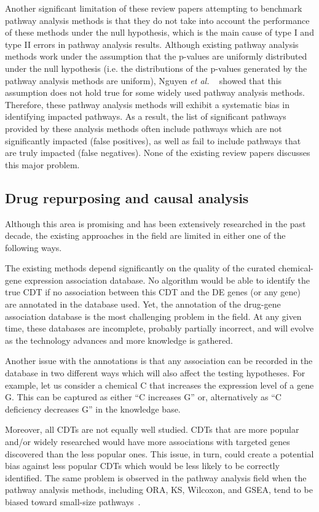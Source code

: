 Another significant limitation of these review papers attempting to benchmark pathway analysis methods is that they do not take into account the performance of these methods under the null hypothesis, which is the main cause of type I and type II errors in pathway analysis results. 
Although existing pathway analysis methods work under the assumption that the p-values are uniformly distributed under the null hypothesis (i.e. the distributions of the p-values generated by the pathway analysis methods are uniform), Nguyen \textit{et al.} ~\cite{nguyen2017DANUBE, nguyen2018network} showed that this assumption does not hold true for some widely used pathway analysis methods. 
Therefore, these pathway analysis methods will exhibit a systematic bias in identifying impacted pathways.
As a result, the list of significant pathways provided by these  analysis methods often include pathways which are not significantly impacted (false positives), as well as fail to include pathways that are truly impacted (false negatives).
None of the existing review papers discusses this major problem.

\subsection{Drug repurposing and causal analysis}

Although this area is promising and has been extensively researched in the past decade, the existing approaches in the field are limited in either one of the following ways.

The existing methods depend significantly on the quality of the curated chemical-gene expression association database. 
No algorithm would be able to identify the true CDT if no association between this CDT and the DE genes (or any gene) are annotated in the database used.
Yet, the annotation of the drug-gene association database is the most challenging problem in the field. 
At any given time, these databases are incomplete, probably partially incorrect, and will evolve as the technology advances and more knowledge is gathered. 

Another issue with the annotations is that any association can be recorded in the database in two different ways which will also affect the testing hypotheses.
For example, let us consider a chemical C that increases  the   expression level of a gene G. This can be captured as either ``C increases G'' or, alternatively as ``C deficiency decreases G'' in the knowledge base. 

Moreover, all CDTs are not equally well studied. CDTs that are more popular and/or widely researched would have more associations with targeted genes discovered than the less popular ones.
This issue, in turn, could create a potential bias against less popular CDTs which would be less likely to be correctly identified.
The same problem is observed in the pathway analysis field when the pathway analysis methods, including ORA, KS, Wilcoxon, and GSEA, tend to be biased toward small-size pathways~\cite{nguyen2019identifying}.

